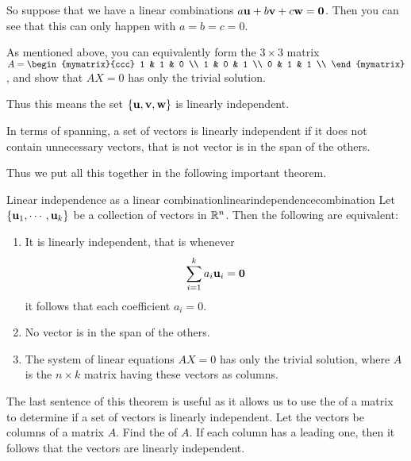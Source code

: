 \begin{solution}
So suppose that we have a linear combinations $a{\bf u} + b {\bf v}
+ c{\bf w} = {\bf 0}$. Then you can see that this can only happen
with $a=b=c=0$.

As mentioned above, you can equivalently form the $3 \times 3$ matrix $A = 
\begin{mymatrix}{ccc}
1  & 1 & 0 \\
1  & 0 & 1 \\
0  & 1 & 1 \\
\end{mymatrix}$, and show that $AX=0$ has only the trivial solution.

Thus this  means the set $\{{\bf u}, {\bf v}, {\bf w} \}$ is linearly independent. 
\end{solution}

In terms of spanning, a set of vectors is linearly independent if it
does not contain unnecessary vectors, that is not vector is in the span of the others.

Thus we put all this together in the following important theorem.

\begin{theorem}{Linear independence as a linear combination}{linearindependencecombination}
Let $\{{\bf u}_{1},\cdots ,{\bf u}_{k}\}$ be a collection of vectors  in
$\mathbb{R}^{n}$. Then the following are equivalent:

\begin{enumerate}
\item It is linearly independent, that is whenever
\begin{equation*}
\sum_{i=1}^{k}a_{i}{\bf u}_{i}={\bf 0}
\end{equation*}
it follows that each coefficient $a_{i}=0$.
\item No vector is in the span of the others.
\item The system of
linear equations $AX=0$ has only the trivial solution, where $A$ is
the $n \times k$ matrix having these vectors as columns. 
\end{enumerate}
\end{theorem}

The last sentence of this theorem is useful as it allows us to use the
{\rref} of a matrix to determine if a set of vectors is linearly
independent. Let the vectors be columns of a matrix $A$. Find the
{\rref} of $A$. If each column has a leading one, then it follows
that the vectors are linearly independent.

